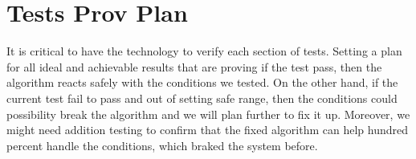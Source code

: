 \documentclass[10pt,draftclsnofoot,onecolumn,journal,compsoc]{IEEEtran}
\begin{document}
\section{Tests Prov Plan}
It is critical to have the technology to verify each section of tests. Setting a plan for all ideal and achievable results that are proving if the test pass, then the algorithm reacts safely with the conditions we tested. On the other hand, if the current test fail to pass and out of setting safe range, then the conditions could possibility break the algorithm and we will plan further to fix it up. Moreover, we might need addition testing to confirm that the fixed algorithm can help hundred percent handle the conditions, which braked the system before.    






















\newpage


\end{document}
